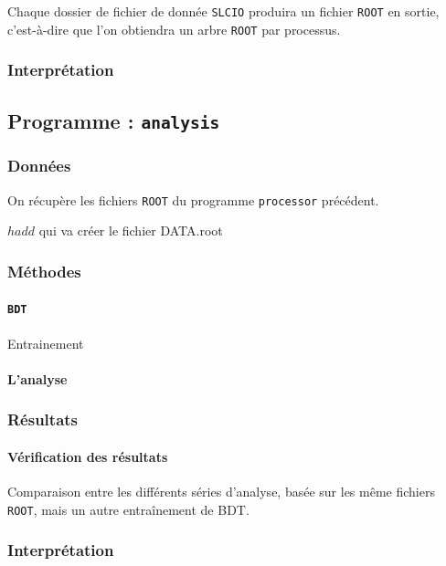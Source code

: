 \documentclass[10pt,a4paper]{report}
\newcommand{\cad}{c'est-à-dire\xspace}
\newcommand{\ROOT}{\texttt{ROOT}\xspace}
\newcommand{\SLCIO}{\texttt{SLCIO}\xspace}
\newcommand{\processor}{\texttt{processor}\xspace}
\newcommand{\analysis}{\texttt{analysis}\xspace}
\begin{document}
Chaque dossier de fichier de donnée \SLCIO produira un fichier \ROOT en sortie, \cad que l'on obtiendra un arbre \ROOT par processus.


\subsubsection{Interprétation}

\subsection{Programme : \analysis}

\subsubsection{Données}

On récupère les fichiers \ROOT du programme \processor précédent. 

$ hadd $ qui va créer le fichier DATA.root

\subsubsection{Méthodes}

\paragraph{\texttt{BDT}}

Entrainement

\paragraph{L'analyse}


\subsubsection{Résultats}

\paragraph{Vérification des résultats}
Comparaison entre les différents séries d'analyse, basée sur les même fichiers \ROOT, mais un autre entraînement de BDT.

\subsubsection{Interprétation}
\end{document}
